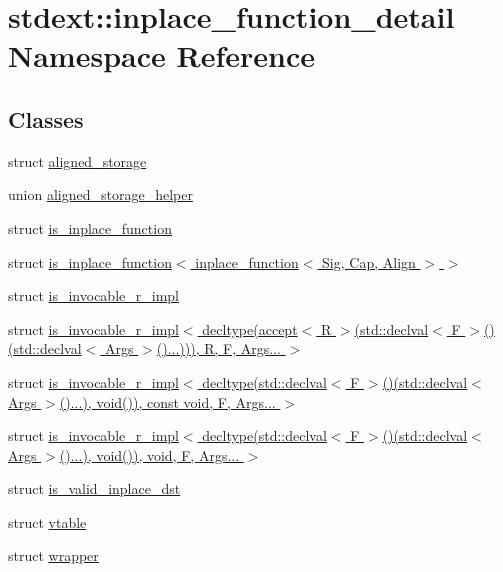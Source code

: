 \hypertarget{namespacestdext_1_1inplace__function__detail}{}\section{stdext\+:\+:inplace\+\_\+function\+\_\+detail Namespace Reference}
\label{namespacestdext_1_1inplace__function__detail}
\subsection*{Classes}
\begin{DoxyCompactItemize}
\item 
struct \hyperlink{structstdext_1_1inplace__function__detail_1_1aligned__storage}{aligned\+\_\+storage}
\item 
union \hyperlink{unionstdext_1_1inplace__function__detail_1_1aligned__storage__helper}{aligned\+\_\+storage\+\_\+helper}
\item 
struct \hyperlink{structstdext_1_1inplace__function__detail_1_1is__inplace__function}{is\+\_\+inplace\+\_\+function}
\item 
struct \hyperlink{structstdext_1_1inplace__function__detail_1_1is__inplace__function_3_01inplace__function_3_01Sig_00_01Cap_00_01Align_01_4_01_4}{is\+\_\+inplace\+\_\+function$<$ inplace\+\_\+function$<$ Sig, Cap, Align $>$ $>$}
\item 
struct \hyperlink{structstdext_1_1inplace__function__detail_1_1is__invocable__r__impl}{is\+\_\+invocable\+\_\+r\+\_\+impl}
\item 
struct \hyperlink{structstdext_1_1inplace__function__detail_1_1is__invocable__r__impl_3_01decltype_07accept_3_01R_32d81c51f4037807d0fe4b47c34d0755}{is\+\_\+invocable\+\_\+r\+\_\+impl$<$ decltype(accept$<$ R $>$(std\+::declval$<$ F $>$()(std\+::declval$<$ Args $>$()...))), R, F, Args... $>$}
\item 
struct \hyperlink{structstdext_1_1inplace__function__detail_1_1is__invocable__r__impl_3_01decltype_07std_1_1declva0b72e3b51b5a25ed55b63381e8d17b0a}{is\+\_\+invocable\+\_\+r\+\_\+impl$<$ decltype(std\+::declval$<$ F $>$()(std\+::declval$<$ Args $>$()...), void()), const void, F, Args... $>$}
\item 
struct \hyperlink{structstdext_1_1inplace__function__detail_1_1is__invocable__r__impl_3_01decltype_07std_1_1declva53be7366370c87c5d74810a4225ea3b9}{is\+\_\+invocable\+\_\+r\+\_\+impl$<$ decltype(std\+::declval$<$ F $>$()(std\+::declval$<$ Args $>$()...), void()), void, F, Args... $>$}
\item 
struct \hyperlink{structstdext_1_1inplace__function__detail_1_1is__valid__inplace__dst}{is\+\_\+valid\+\_\+inplace\+\_\+dst}
\item 
struct \hyperlink{structstdext_1_1inplace__function__detail_1_1vtable}{vtable}
\item 
struct \hyperlink{structstdext_1_1inplace__function__detail_1_1wrapper}{wrapper}
\end{DoxyCompactItemize}
